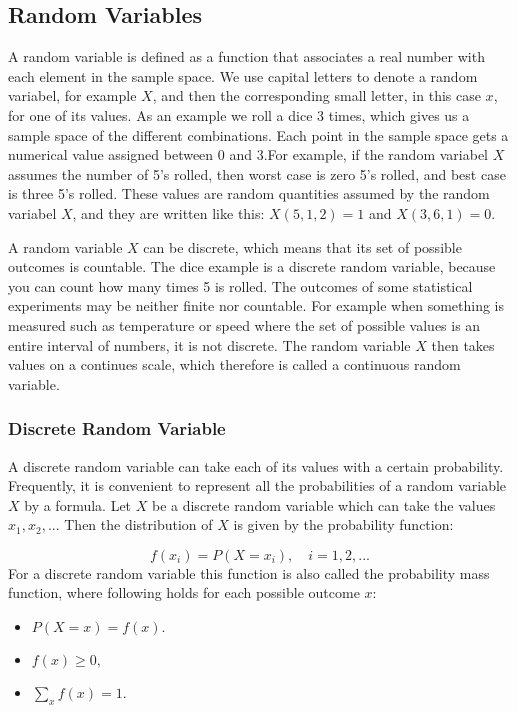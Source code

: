 
\subsection{Random Variables}
A random variable is defined as a function that associates a real number with each element in the sample space. We use capital letters to denote a random variabel, for example $X$, and then the corresponding small letter, in this case $x$, for one of its values. As an example we roll a dice 3 times, which gives us a sample space of the different combinations. Each point in the sample space gets a numerical value assigned between 0 and 3.For example, if the random variabel $X$ assumes the number of 5's rolled, then worst case is zero 5's rolled, and best case is three 5's rolled. These values are random quantities assumed by the random variabel $X$, and they are written like this: $X(5,1,2) = 1$ and $X(3,6,1) = 0$.
\newline

\noindent A random variable $X$ can be discrete, which means that its set of possible outcomes is countable. The dice example is a discrete random variable, because you can count how many times 5 is rolled. The outcomes of some statistical experiments may be neither finite nor countable. For example when something is measured such as temperature or speed where the set of possible values is an entire interval of numbers, it is not discrete. The random variable $X$ then takes values on a continues scale, which therefore is called a continuous random variable.

\subsubsection{Discrete Random Variable}
\label{sec:disc}
A discrete random variable can take each of its values with a certain probability. Frequently, it is convenient to represent all the probabilities of a random variable $X$ by a formula. Let $X$ be a discrete random variable which can take the values $x_{1}, x_{2},...$ Then the distribution of $X$ is given by the probability function:

\begin{equation}
	f(x_{i})=P(X=x_{i}),\quad i=1,2,...
\end{equation}
\newline
For a discrete random variable this function is also called the probability mass function, where following holds for each possible outcome $x$:

\begin{itemize}
	\item $P(X = x) = f(x).$
	\item $f(x) \geq 0,$
	\item $\sum_x f(x) = 1.$
\end{itemize}

